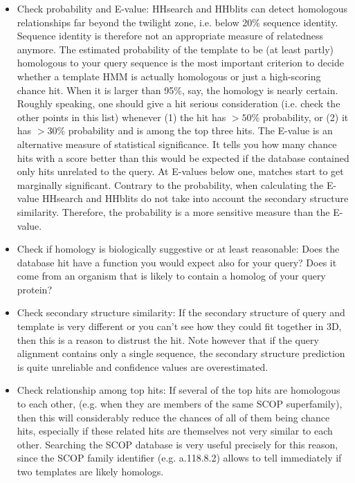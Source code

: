 \documentclass[11pt,a4paper]{article}
\begin{document}
\begin{itemize}

\item{Check probability and E-value: HHsearch and HHblits can detect homologous relationships far beyond the twilight zone, i.e. below 20\% sequence identity. Sequence identity is therefore not an appropriate measure of relatedness anymore. The estimated probability of the template to be (at least partly) homologous to your query sequence is the most important criterion to decide whether a template HMM is actually homologous or just a high-scoring chance hit. When it is larger than 95\%, say, the homology is nearly certain. Roughly speaking, one should give a hit serious consideration (i.e. check the other points in this list) whenever (1) the hit has $>50\%$ probability, or (2) it has $>30\%$ probability and is among the top three hits. The E-value is an alternative measure of statistical significance. It tells you how many chance hits with a score better than this would be expected if the database contained only hits unrelated to the query. At E-values below one, matches start to get marginally significant. Contrary to the probability, when calculating the E-value HHsearch and HHblits do not take into account the secondary structure similarity. Therefore, the probability is a more sensitive measure than the E-value.}

\item{Check if homology is biologically suggestive or at least reasonable: Does the database hit have a function you would expect also for your query? Does it come from an organism that is likely to contain a homolog of your query protein?}

\item{Check secondary structure similarity: If the secondary structure of query and template is very different or you can't see how they could fit together in 3D, then this is a reason to distrust the hit. Note however that if the query alignment contains only a single sequence, the secondary structure prediction is quite unreliable and confidence values are overestimated.}

\item{Check relationship among top hits: If several of the top hits are homologous to each other, (e.g. when they are members of the same SCOP superfamily), then this will considerably reduce the chances of all of them being chance hits, especially if these related hits are themselves not very similar to each other. Searching the SCOP database is very useful precisely for this reason, since the SCOP family identifier (e.g. a.118.8.2) allows to tell immediately if two templates are likely homologs.}


\end{itemize}
\end{document}
